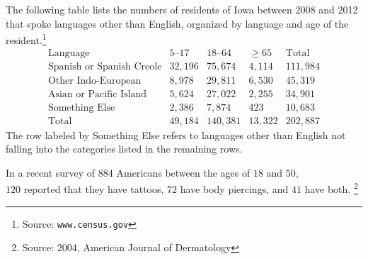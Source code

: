 \documentclass[answers,addpoints,12pt]{exam}
\begin{document}
\begin{questions}
\question[18] The following table lists the numbers
of residents of Iowa between 2008 and 2012 that
spoke languages other than English, organized by
language and age
of the resident.\footnote{Source: {\tt www.census.gov}}
\[\begin{array}{r|rrr|r}
\text{Language}&\text{$5$--$17$}
&\text{$18$--$64$}&\ge 65&\text{Total}\\\hline
\text{Spanish or Spanish Creole}&32,196&75,674&4,114&111,984\\
\text{Other Indo-European}&8,978&29,811&6,530&45,319\\
\text{Asian or Pacific Island}&5,624&27,022&2,255&34,901\\
\text{Something Else}&2,386&7,874&423&10,683\\\hline
\text{Total}&49,184&140,381&13,322&202,887
\end{array}\]
The row labeled by Something Else refers to languages
other than English not falling into the categories
listed in the remaining rows.

\question[24] In a recent survey of 884 Americans between the ages
of $18$ and $50$,\\ $120$ reported that they have tattoos,
$72$ have body piercings, and $41$ have both.
\footnote{Source: 2004, American Journal of Dermatology}


\end{questions}
\end{document}
